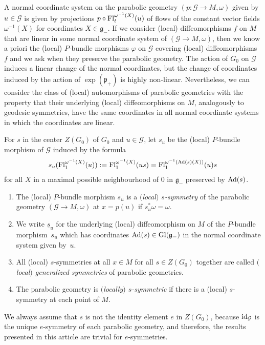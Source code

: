 \documentclass[10pt,a4paper]{amsart}
\newcommand{\om}{\omega}
\newcommand{\un}{\underline}
\newcommand{\ba}{\mathcal{G}}
\newcommand{\va}{\varphi}
\newcommand{\fg}{\mathfrak g}
\newcommand{\fp}{\mathfrak p}
\newcommand{\Ad}{{\rm Ad}}
\newcommand{\Fl}{{\rm Fl}}
\newcommand{\id}{{\rm id}}
\numberwithin{equation}{section}
\begin{document}
A normal coordinate system on the parabolic geometry $(p\colon \ba\to M,\om)$ given by $u\in \ba$ is given by projections $p\circ \Fl_t^{\om^{-1}(X)}(u)$ of f\/lows of the constant vector f\/ields $\om^{-1}(X)$ for coordinates $X\in \fg_-$. If we consider (local) dif\/feomorphisms $f$ on $M$ that are linear in some normal coordinate system of $(\ba\to M,\om)$, then we know a priori the (local) $P$-bundle morphisms $\va$ on $\ba$ covering (local) dif\/feomorphisms~$f$ and we ask when they preserve the parabolic geometry. The action of $G_0$ on $\ba$ induces a linear change of the normal coordinates, but the change of coordinates induced by the action of $\exp(\fp_+)$ is highly non-linear. Nevertheless, we can consider the class of (local) automorphisms of parabolic geometries with the property that their underlying (local) dif\/feomorphisms on $M$, analogously to geodesic symmetries, have the same coordinates in all normal coordinate systems in which the coordinates are linear.

\begin{Definition} \label{def3}
For $s$ in the center $Z(G_0)$ of $G_0$ and $u\in \ba$, let $s_u$ be the (local) $P$-bundle morphism of $\ba$ induced by the formula
\begin{gather*}s_u(\Fl_1^{\om^{-1}(X)}(u)):=\Fl_1^{\om^{-1}(X)}(us)=\Fl_1^{\om^{-1}(\Ad(s) (X))}(u)s\end{gather*}
for all $X$ in a maximal possible neighbourhood of $0$ in $\fg_-$ preserved by $\Ad(s)$.
\begin{enumerate}\itemsep=0pt
\item The (local) $P$-bundle morphism $s_u$ is a \emph{$($local$)$ $s$-symmetry} of the parabolic geometry $(\ba\to M,\om)$ at $x=p(u)$ if $s_u^*\om=\om$.
\item We write $\un s_u$ for the underlying (local) dif\/feomorphism on $M$ of the $P$-bundle mor\-phism~$s_u$ which has coordinates $\Ad(s)\in {\rm Gl}(\fg_-)$ in the normal coordinate system given by~$u$.
\item All (local) $s$-symmetries at all $x\in M$ for all $s\in Z(G_0)$ together are called \emph{$($local$)$ gene\-ra\-li\-zed symmetries} of parabolic geometries.
\item The parabolic geometry is \emph{$($locally$)$ $s$-symmetric} if there is a (local) $s$-symmetry at each point of $M$.
\end{enumerate}
\end{Definition}
\begin{Remark}
We always assume that $s$ is not the identity element $e$ in $Z(G_0)$, because $\id_\ba$ is the unique $e$-symmetry of each parabolic geometry, and therefore, the results presented in this article are trivial for $e$-symmetries.
\end{Remark}
\end{document}
